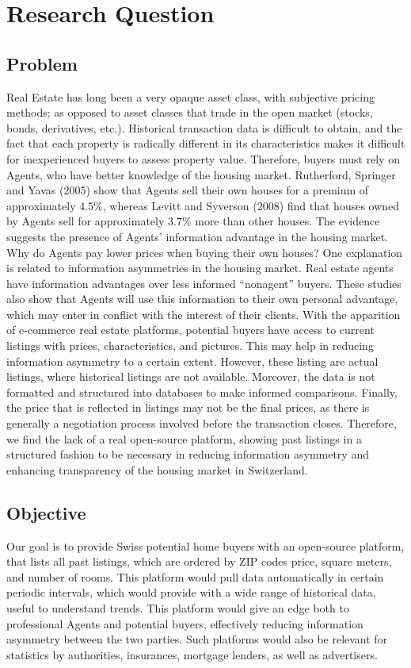\documentclass[main]{subfiles}
\begin{document}
\section{Research Question}
\subsection{Problem}
Real Estate has long been a very opaque asset class, with subjective pricing methods; 
as opposed to asset classes that trade in the open market (stocks, bonds, derivatives, etc.). Historical transaction data is difficult to obtain, and the fact that each property is radically different in its characteristics makes it difficult for 
inexperienced buyers to assess property value. 
Therefore, buyers must rely on Agents, who have better knowledge of the housing market. 
Rutherford, Springer and Yavas (2005)  \cite{rutherfordConflictsPrincipalsAgents2005} show that Agents sell their own houses for a premium of approximately 
4.5\%, whereas Levitt and Syverson (2008) \cite{levittMarketDistortionsWhen2005} find that houses owned by Agents sell for approximately 
3.7\% more than other houses. The evidence suggests the presence of Agents' 
information advantage in the housing market. 
Why do Agents pay lower prices when buying their own houses? One explanation is related to
 information asymmetries in the housing market. Real estate agents have information advantages over less informed “nonagent” buyers. These studies also show that Agents will use this information to their own personal advantage, which may enter in conflict with the interest of their clients.
With the apparition of e-commerce real estate platforms, potential buyers have access to current 
listings with prices, characteristics, and pictures. 
This may help in reducing information asymmetry to a certain extent. However,
 these listing are actual listings, where historical listings are not available. 
 Moreover, the data is not formatted and structured into databases to make informed comparisons. Finally, the price that is reflected in listings may not be the final prices, as there is generally a negotiation process involved before the transaction closes.
Therefore, we find the lack of a real open-source platform, showing past listings in a structured fashion to be necessary in reducing information asymmetry and enhancing transparency of the housing market in Switzerland.

\subsection{Objective}
Our goal is to provide Swiss potential home buyers with an open-source platform, that lists all past listings, 
which are ordered by ZIP codes 
price, square meters, and number of rooms. This platform would pull data automatically in certain periodic intervals, 
which would provide with a wide range of historical data, useful to understand trends. 
This platform would give an edge both to professional Agents and potential buyers, 
effectively reducing information asymmetry between the two parties.
Such platforms would also be relevant for statistics by authorities, insurances, mortgage lenders, as well as advertisers.
\end{document}
